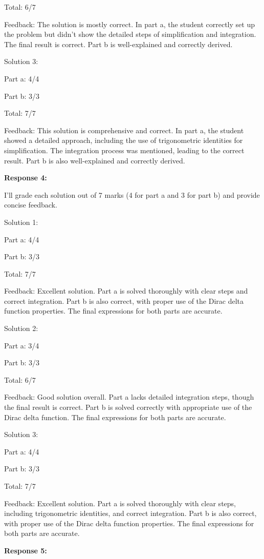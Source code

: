 \documentclass[a4paper,11pt]{article}
\begin{document}
Total: 6/7

Feedback: The solution is mostly correct. In part a, the student correctly set up the problem but didn't show the detailed steps of simplification and integration. The final result is correct. Part b is well-explained and correctly derived.

Solution 3:

Part a: 4/4

Part b: 3/3

Total: 7/7

Feedback: This solution is comprehensive and correct. In part a, the student showed a detailed approach, including the use of trigonometric identities for simplification. The integration process was mentioned, leading to the correct result. Part b is also well-explained and correctly derived.

\bigskip   
\textbf{Response 4:}

I'll grade each solution out of 7 marks (4 for part a and 3 for part b) and provide concise feedback.

Solution 1:

Part a: 4/4

Part b: 3/3

Total: 7/7

Feedback: Excellent solution. Part a is solved thoroughly with clear steps and correct integration. Part b is also correct, with proper use of the Dirac delta function properties. The final expressions for both parts are accurate.

Solution 2:

Part a: 3/4

Part b: 3/3

Total: 6/7

Feedback: Good solution overall. Part a lacks detailed integration steps, though the final result is correct. Part b is solved correctly with appropriate use of the Dirac delta function. The final expressions for both parts are accurate.

Solution 3:

Part a: 4/4

Part b: 3/3

Total: 7/7

Feedback: Excellent solution. Part a is solved thoroughly with clear steps, including trigonometric identities, and correct integration. Part b is also correct, with proper use of the Dirac delta function properties. The final expressions for both parts are accurate.

\bigskip   
\textbf{Response 5:}
\end{document}
